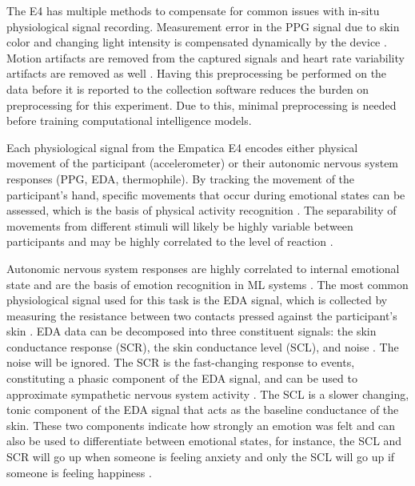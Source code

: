 \documentclass[12pt]{iopart}
\begin{document}
The E4 has multiple methods to compensate for common issues with in-situ physiological signal recording.  Measurement error in the PPG signal due to skin color and changing light intensity is compensated dynamically by the device \cite{goodwin2019predicting}.  Motion artifacts are removed from the captured signals and heart rate variability artifacts are removed as well \cite{goodwin2019predicting}.  Having this preprocessing be performed on the data before it is reported to the collection software reduces the burden on preprocessing for this experiment.  Due to this, minimal preprocessing is needed before training computational intelligence models.

Each physiological signal from the Empatica E4 encodes either physical movement of the participant (accelerometer) or their autonomic nervous system responses (PPG, EDA, thermophile).  By tracking the movement of the participant’s hand, specific movements that occur during emotional states can be assessed, which is the basis of physical activity recognition \cite{ravi2005activity}.  The separability of movements from different stimuli will likely be highly variable between participants and may be highly correlated to the level of reaction \cite{thang2012gait}.

Autonomic nervous system responses are highly correlated to internal emotional state \cite{kreibig2010autonomic} and are the basis of emotion recognition in ML systems \cite{healey2005detecting}.  The most common physiological signal used for this task is the EDA signal, which is collected by measuring the resistance between two contacts pressed against the participant’s skin \cite{society2012publication, arce2021biosensor}.  EDA data can be decomposed into three constituent signals: the skin conductance response (SCR), the skin conductance level (SCL), and noise \cite{greco2015cvxeda}.  The noise will be ignored.  The SCR is the fast-changing response to events, constituting a phasic component of the EDA signal, and can be used to approximate sympathetic nervous system activity \cite{society2012publication, benedek2010continuous}.  The SCL is a slower changing, tonic component of the EDA signal that acts as the baseline conductance of the skin.  These two components indicate how strongly an emotion was felt and can also be used to differentiate between emotional states, for instance, the SCL and SCR will go up when someone is feeling anxiety and only the SCL will go up if someone is feeling happiness \cite{kreibig2010autonomic}.  
\end{document}
